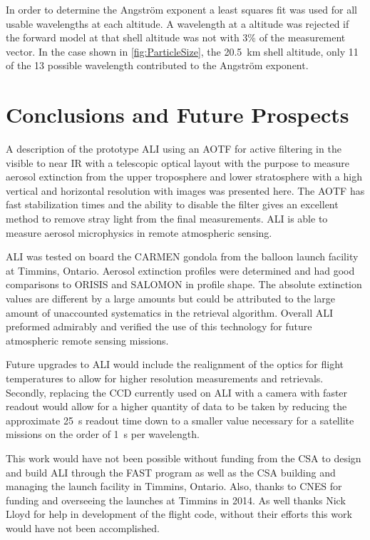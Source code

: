 \documentclass[12pt]{article}
\begin{document}
In order to determine the Angstr\"{o}m exponent a least squares fit was used for all usable wavelengths at each altitude. A wavelength at a altitude was rejected if the forward model at that shell altitude was not with 3\% of the measurement vector. In the case shown in \autoref{fig:ParticleSize}, the 20.5~km shell altitude, only 11 of the 13 possible wavelength contributed to the Angstr\"{o}m exponent.

\section{Conclusions and Future Prospects}

A description of the prototype ALI using an AOTF for active filtering in the visible to near IR with a telescopic optical layout with the purpose to measure aerosol extinction from the upper troposphere and lower stratosphere with a high vertical and horizontal resolution with images was presented here. The AOTF has fast stabilization times and the ability to disable the filter gives an excellent method to remove stray light from the final measurements. ALI is able to measure aerosol microphysics in remote atmospheric sensing.

ALI was tested on board the CARMEN gondola from the balloon launch facility at Timmins, Ontario. Aerosol extinction profiles were determined and had good comparisons to ORISIS and SALOMON in profile shape. The absolute extinction values are different by a large amounts but could be attributed to the large amount of unaccounted systematics in the retrieval algorithm. Overall ALI preformed admirably and verified the use of this technology for future atmospheric remote sensing missions.

Future upgrades to ALI would include the realignment of the optics for flight temperatures to allow for higher resolution measurements and retrievals. Secondly, replacing the CCD currently used on ALI with a camera with faster readout would allow for a higher quantity of data to be taken by reducing the approximate 25~s readout time down to a smaller value necessary for a satellite missions on the order of 1~s per wavelength.

This work would have not been possible without funding from the CSA to design and build ALI through the FAST program as well as the CSA building and managing the launch facility in Timmins, Ontario. Also, thanks to CNES for funding and overseeing the launches at Timmins in 2014. As well thanks Nick Lloyd for help in development of the flight code, without their efforts this work would have not been accomplished.
\end{document}
